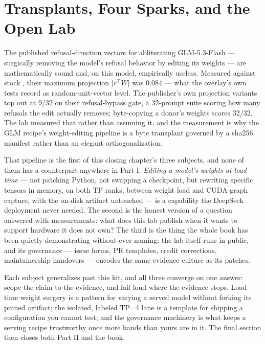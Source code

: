 
\chapter{Transplants, Four Sparks, and the Open Lab}
\label{ch:transplants}

The published refusal-direction vectors for abliterating GLM-5.3-Flash ---
surgically removing the model's refusal behavior by editing its weights ---
are mathematically sound and, on this model, empirically useless. Measured
against stock , their maximum projection
$\lvert r^{\top}W\rvert$ was $0.084$ --- what the overlay's own tests record
as random-unit-vector level.
The publisher's own projection variants top out at 9/32 on their
refusal-bypass gate, a 32-prompt suite scoring how many refusals the edit
actually removes; byte-copying a donor's weights scores 32/32. The lab
measured that rather than assuming it, and the measurement is why the GLM
recipe's weight-editing pipeline is a byte transplant governed by a sha256
manifest rather than an elegant orthogonalization.

That pipeline is the first of this closing chapter's three subjects, and
none of them has a counterpart anywhere in Part I. \emph{Editing a
model's weights at load time} --- not patching Python, not swapping a
checkpoint, but rewriting specific tensors in memory, on both TP ranks,
between weight load and CUDA-graph capture, with the on-disk artifact
untouched --- is a capability the DeepSeek deployment never needed. The
second is the honest version of a question  answered with
measurements: what does this lab publish when it wants to support hardware
it does not own? The third is the thing the whole book has been quietly
demonstrating without ever naming: the lab itself runs in public, and its
governance --- issue forms, PR templates, credit corrections, maintainership
handovers --- encodes the same evidence culture as its patches.

Each subject generalizes past this kit, and all three converge on one
answer: scope the claim to the evidence, and fail loud where the evidence
stops. Load-time weight surgery is a pattern for varying a served model
without forking its pinned artifact; the isolated, labeled TP=4 lane is a
template for shipping a configuration you cannot test; and the governance
machinery is what keeps a serving recipe trustworthy once more hands than
yours are in it. The final section then closes both Part II and the book.

